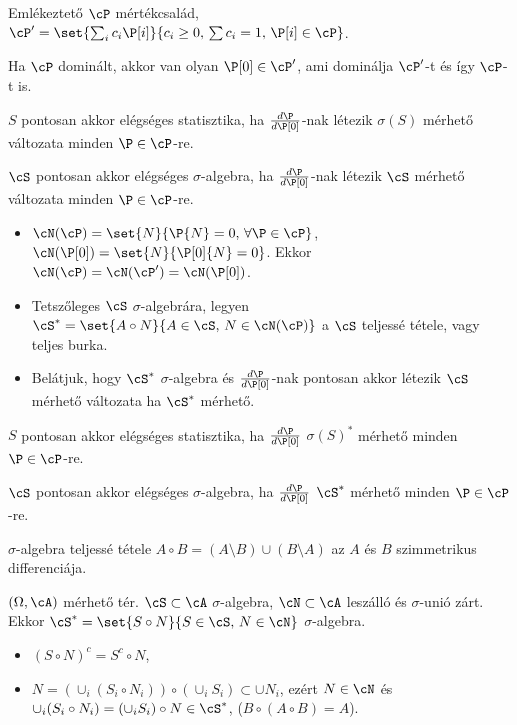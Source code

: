 \documentclass[aspectratio=169,notheorems,9pt,\option]{beamer}
\begin{document}
\begin{frame}{Emlékeztető}
  $\cP$ mértékcsalád, $\cP'=\set{\sum_{i} c_i\P[i]}{c_i\geq0,\,\sum c_i=1,\,\P[i]\in\cP}$.
  \begin{proposition}
    Ha $\cP$ dominált, akkor van olyan $\P[0]\in\cP'$, ami dominálja $\cP'$-t és így $\cP$-t is.
  \end{proposition}
  \begin{proposition}
    $S$  pontosan akkor elégséges statisztika, 
    ha $\frac{d\P}{d\P[0]}$-nak létezik $\sigma(S)$ mérhető változata minden $\P\in\cP$-re.
 
    $\cS$  pontosan akkor elégséges $\sigma$-algebra, 
    ha $\frac{d\P}{d\P[0]}$-nak létezik $\cS$ mérhető változata minden $\P\in\cP$-re.
  \end{proposition}

  \begin{itemize}
    \item $\cN(\cP)=\set{N}{\P{N}=0,\,\forall \P\in\cP}$, $\cN(\P[0])=\set{N}{\P[0]{N}=0}$. 
    Ekkor $\cN(\cP)=\cN(\cP')=\cN(\P[0])$.
    \item Tetszőleges $\cS$ $\sigma$-algebrára, legyen 
    $\cS^*=\set{A\circ N}{A\in\cS,\,N\in\cN(\cP)}$ a $\cS$ teljessé tétele, vagy teljes burka.
    \item Belátjuk, hogy $\cS^*$ $\sigma$-algebra és 
     $\frac{d\P}{d\P[0]}$-nak pontosan akkor létezik $\cS$ mérhető változata
    ha $\cS^*$ mérhető.
  \end{itemize}

  \begin{proposition}
    $S$  pontosan akkor elégséges statisztika, 
    ha $\frac{d\P}{d\P[0]}$  $\sigma(S)^*$ mérhető minden $\P\in\cP$-re.
 
    $\cS$  pontosan akkor elégséges $\sigma$-algebra, 
    ha $\frac{d\P}{d\P[0]}$  $\cS^*$ mérhető minden $\P\in\cP$-re.
  \end{proposition}

\end{frame}

\begin{frame}{$\sigma$-algebra teljessé tétele}
  $A\circ B=(A\setminus B)\cup(B\setminus A)$ az $A$ és $B$ szimmetrikus differenciája.
  \begin{proposition}
    $(\Omega,\cA)$ mérhető tér. $\cS\subset\cA$ $\sigma$-algebra, 
    $\cN\subset\cA$ leszálló és $\sigma$-unió zárt. Ekkor
    $\cS^*=\set{S\circ N}{S\in\cS,\,N\in\cN}$ $\sigma$-algebra.
  \end{proposition}
  \begin{itemize}
    \item $(S\circ N)^c=S^c\circ N$,
    \item $N=(\cup_i (S_i\circ N_i))\circ (\cup_i S_i)\subset \cup N_i$, ezért $N\in\cN$ és
    $\cup_i (S_i\circ N_i)= (\cup_i S_i)\circ N\in\cS^*$, ($B\circ(A\circ B)=A$).
  \end{itemize}
\end{frame}
\end{document}
